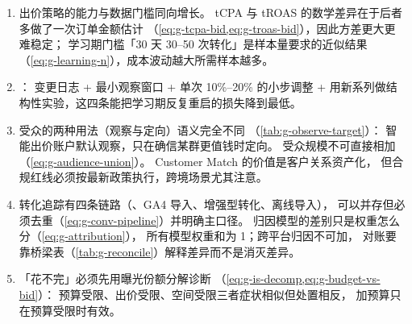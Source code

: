 \begin{keypoint}[本章要点回顾]
\begin{enumerate}
        决定了不能用「当周 ROAS」评价品牌型投放。
        创意上要执行「前 5 秒只做一件事、钩子矩阵测试、长短版按 1:3 到 1:5 配比」。
  \item 出价策略的能力与数据门槛同向增长。
        tCPA 与 tROAS 的数学差异在于后者多做了一次订单金额估计
        （\cref{eq:g-tcpa-bid,eq:g-troas-bid}），因此方差更大更难稳定；
        学习期门槛「30 天 30--50 次转化」是样本量要求的近似结果
        （\cref{eq:g-learning-n}），成本波动越大所需样本越多。
  \item {}：
        变更日志 + 最小观察窗口 + 单次 10\%--20\% 的小步调整
        + 用新系列做结构性实验，这四条能把学习期反复重启的损失降到最低。
  \item 受众的两种用法（观察与定向）语义完全不同
        （\cref{tab:g-observe-target}）：
        智能出价账户默认观察，只在确信某群更值钱时定向。
        受众规模不可直接相加（\cref{eq:g-audience-union}）。
        Customer Match 的价值是客户关系资产化，
        但合规红线必须按最新政策执行，跨境场景尤其注意。
  \item 转化追踪有四条链路（、GA4 导入、增强型转化、离线导入），
        可以并存但必须去重（\cref{eq:g-conv-pipeline}）并明确主口径。
        归因模型的差别只是权重怎么分（\cref{eq:g-attribution}），
        所有模型权重和为 1；跨平台归因不可加，
        对账要靠桥梁表（\cref{tab:g-reconcile}）解释差异而不是消灭差异。
  \item 「花不完」必须先用曝光份额分解诊断
        （\cref{eq:g-is-decomp,eq:g-budget-vs-bid}）：
        预算受限、出价受限、空间受限三者症状相似但处置相反，
        加预算只在预算受限时有效。
\end{enumerate}
\end{keypoint}

